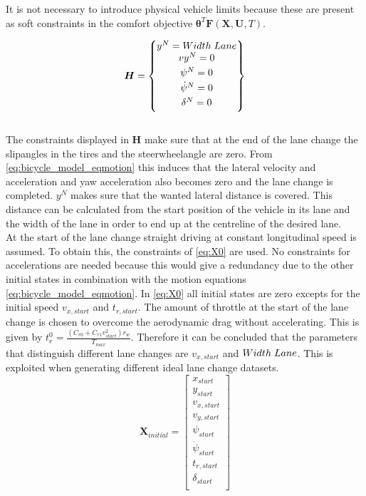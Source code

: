 It is not necessary to introduce physical vehicle limits because these are present as soft constraints in the comfort objective $\bm{\theta}^T\bm{F}(\bm{X},\bm{U}, T)$.

\begin{equation}\label{eq:H}
\bm{H} =
\begin{Bmatrix}
y^N = Width\hspace{1mm}Lane \\ \vspace{1mm}
vy^N = 0 \\\vspace{1mm}
\psi^N = 0 \\\vspace{1mm}
\dot{\psi}^N = 0 \\\vspace{1mm}
\delta^N = 0 

\end{Bmatrix}
\end{equation}\\

The constraints displayed in $\bm{H}$ make sure that at the end of the lane change the slipangles in the tires and the steerwheelangle are zero. From \ref{eq:bicycle_model_eqmotion} this induces that the lateral velocity and acceleration and yaw acceleration also becomes zero and the lane change is completed. $y^N$ makes sure that the wanted lateral distance is covered. This distance can be calculated from the start position of the vehicle in its lane and the width of the lane in order to end up at the centreline of the desired lane. \\ At the start of the lane change straight driving at constant longitudinal speed is assumed. To obtain this, the constraints of \ref{eq:X0} are used. No constraints for accelerations are needed because this would give a redundancy due to the other initial states in combination with the motion equations \ref{eq:bicycle_model_eqmotion}. In \ref{eq:X0} all initial states are zero excepts for the initial speed $v_{x,start}$ and $t_{r,start}$. The amount of throttle at the start of the lane change is chosen to overcome the aerodynamic drag without accelerating. This is given by $t_r^0 = \frac{(C_{r0}+C_{r1}v_{start}^2)r_w}{T_{max}}$. Therefore it can be concluded that the parameters that distinguish different lane changes are $v_{x,start}$ and $Width\hspace{1mm}Lane$. This is exploited when generating different ideal lane change datasets. 
\begin{equation}\label{eq:X0}
\bm{X}_{initial} =
\begin{bmatrix}
 x_{start}\\ 
 y_{start}\\
 v_{x,start}\\
 v_{y,start}\\
 \psi_{start}\\
 \dot{\psi}_{start}\\
 t_{r,start}\\
 \delta_{start}\\

\end{bmatrix}
\end{equation}\\


